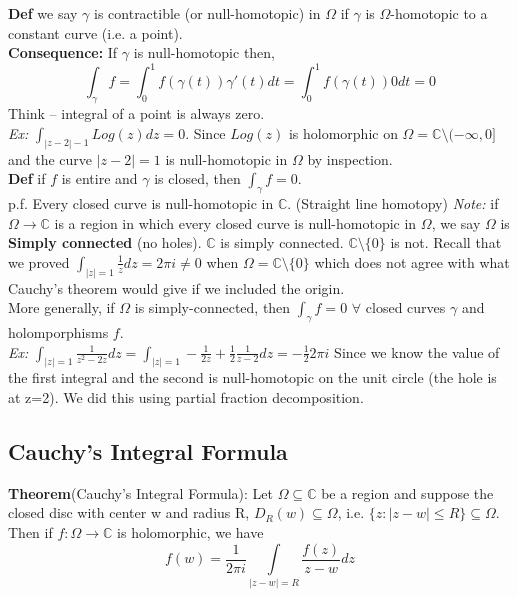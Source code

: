 \documentclass[a4paper, 11pt]{article}
\begin{document}
	\noindent \textbf{Def} we say $\gamma$ is contractible (or null-homotopic) in $\Omega$ if $\gamma$ is $\Omega$-homotopic to a constant curve (i.e. a point). \\
	
	\noindent \textbf{Consequence:} If $\gamma$ is null-homotopic then,
		\begin{equation*}
			\int_{\gamma} f = \int_0^1 f(\gamma(t))\gamma'(t)dt = \int_0^1 f(\gamma(t))0dt = 0 
		\end{equation*}
	\noindent Think -- integral of a point is always zero. \\ 
	
	\noindent\textit{Ex:} $\int_{|z-2|-1} Log(z)dz = 0$. Since $Log(z)$ is holomorphic on $\Omega = \mathbb{C}\setminus(-\infty, 0]$ and the curve $|z-2|=1$ is null-homotopic in $\Omega$ by inspection. \\
	
	\noindent \textbf{Def} if $f$ is entire and $\gamma$ is closed, then $\int_\gamma f=0$. \\
	
	\noindent p.f. Every closed curve is null-homotopic in $\mathbb{C}$. (Straight line homotopy) \textit{Note:} if $\Omega\rightarrow\mathbb{C}$ is a region in which every closed curve is null-homotopic in $\Omega$, we say $\Omega$ is \textbf{Simply connected} (no holes). $\mathbb{C}$ is simply connected. $\mathbb{C}\setminus\{0\}$ is not. Recall that we proved $\int_{|z|=1}\frac{1}{z}dz = 2\pi i \neq 0$ when $\Omega = \mathbb{C}\setminus\{0\}$ which does not agree with what Cauchy's theorem would give if we included the origin. \\
	
	\noindent More generally, if $\Omega$ is simply-connected, then $\int_\gamma f=0$ $\forall$ closed curves $\gamma$ and holomporphisms $f$. \\
	
	\noindent \textit{Ex:} $\int_{|z|=1}\frac{1}{z^2-2z}dz =\int_{|z|=1}-\frac{1}{2z}+\frac{1}{2}\frac{1}{z-2}dz = -\frac{1}{2}2\pi i$ Since we know the value of the first integral and the second is null-homotopic on the unit circle (the hole is at z=2). We did this using partial fraction decomposition. 
	
	
\subsection*{Cauchy's Integral Formula} 
	\textbf{Theorem}(Cauchy's Integral Formula): Let $\Omega\subseteq\mathbb{C}$ be a region and suppose the closed disc with center w and radius R, $D_R(w)\subseteq \Omega$, i.e. $\{z: |z-w|\leq R\}\subseteq \Omega$. Then if $f:\Omega\rightarrow\mathbb{C}$ is holomorphic, we have
		\begin{equation*}
			f(w) = \frac{1}{2\pi i}\int\limits_{|z-w|=R} \frac{f(z)}{z-w} dz  
		\end{equation*}
	
	
\end{document}
